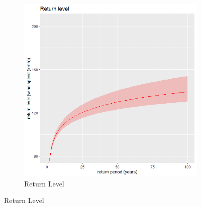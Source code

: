 \documentclass[usenames,dvipsnames]{beamer}
\begin{document}
\begin{frame}
\begin{figure}
\begin{subfigure}[b]{0.4\textwidth}
    \includegraphics[width=\textwidth]{RetLev.png}
    \caption{Return Level}
    \label{fig:sub1}
  \end{subfigure}
\end{figure}
    
\end{frame}
\end{document}
